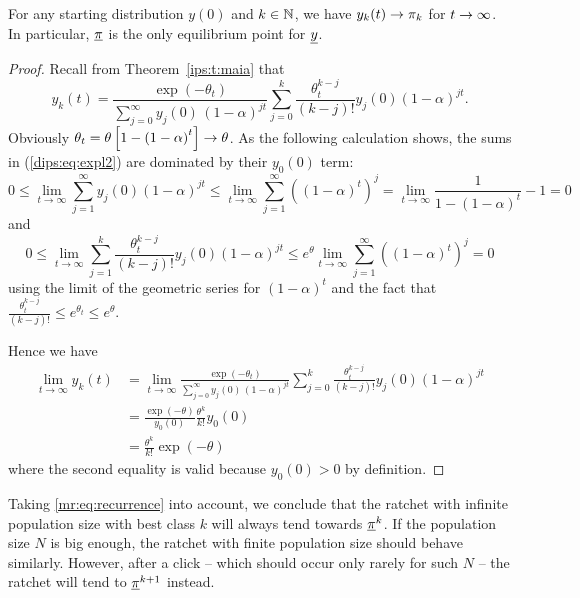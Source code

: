 \begin{Corollary} \label{ips:c:conv}
For any starting distribution $y(0)$ and $k \in \mathbb{N}$, we have $y_k(t) \rightarrow
\pi_k$ for $t \rightarrow \infty$. In particular, $\underline{\pi}$ is the only
equilibrium point for $\underline{y}$.
\end{Corollary}
\begin{proof}
Recall from Theorem~\eqref{ips:t:maia} that
\begin{equation} \label{dips:eq:expl2}
y_k(t) = \frac{\exp(-\theta_t)}{\sum_{j=0}^\infty
y_j(0) \, (1-\alpha)^{j t}}
\sum_{j=0}^k \frac{\theta^{k-j}_t}{(k-j)!} y_{j}(0) (1-\alpha)^{j t}.
\end{equation}
Obviously $\theta_t = \theta \left[ 1 - \left(1-\alpha \right)^t \right] \rightarrow
\theta$. As the following calculation shows, the sums in (\ref{dips:eq:expl2}) are dominated by their
$y_{0}(0)$ term:
\[
0 \leq
\lim_{t \to \infty} \sum_{j=1}^\infty y_{j}(0)(1-\alpha)^{j t} \leq
\lim_{t \to \infty} \sum_{j=1}^\infty \left( \left(1-\alpha \right)^{t} \right)^j =
\lim_{t \to \infty} \frac{1}{1-(1-\alpha)^t} - 1 = 0
\]
and
\[
0 
\leq \lim_{t \to \infty} \sum_{j=1}^k \frac{\theta^{k-j}_t}{(k-j)!} y_{j}(0)
	(1-\alpha)^{j t}
\leq e^\theta \lim_{t \to \infty} \sum_{j=1}^\infty \left( \left(1-\alpha
	\right)^{t} \right)^j =
0
\]
using the limit of the geometric series for $\left(1-\alpha \right)^{t}$ and
the fact that $\frac{\theta_t^{k-j}}{(k-j)!} \leq e^{\theta_t} \leq e^\theta $.

\noindent
Hence we have
\begin{align*}
\lim_{t \to \infty} y_{k}(t) &=
\lim_{t \to \infty} \frac{\exp(-\theta_t)}{\sum_{j=0}^\infty y_{j}(0) \,
(1-\alpha)^{j t}} \sum_{j=0}^k \frac{\theta^{k-j}_t}{(k-j)!} y_{j}(0)
(1-\alpha)^{j t} \\
&= \frac{\exp(-\theta)}{y_{0}(0)}
\frac{	\theta^k}{k!} y_{0}(0) \\
&= \frac{\theta^k}{k!} \exp(-\theta) 
\end{align*}
where the second equality is valid because $y_0(0) > 0$ by definition.
\end{proof}

\noindent
Taking \eqref{mr:eq:recurrence} into account, we conclude that the ratchet with infinite
population size with best class $k$ will always tend towards
$\underline{\pi}^{k}$. If the population size $N$ is big enough, the ratchet with
finite population size should behave similarly. However, after a click --
which should occur only rarely for such $N$ -- the ratchet will tend to
$\underline{\pi}^{k+1}$ instead. 

